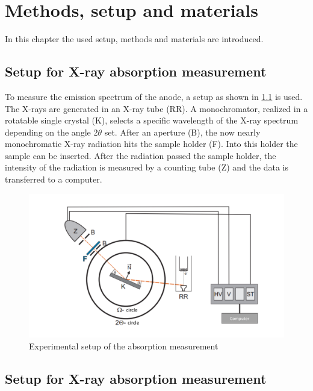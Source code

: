 

\chapter{Methods, setup and materials}
\label{chap:methods}

In this chapter the used setup, methods and materials are introduced.

\section[Absorption measurement]{Setup for X-ray absorption measurement}
\label{sec:SetupAbsorb}
To measure the emission spectrum of the anode, a setup as shown in \cref{fig:setupabs} is used. The X-rays are generated in an X-ray tube (RR). A monochromator, realized in a rotatable single crystal (K), 
selects a specific wavelength of the X-ray spectrum depending on the angle 2$\theta$ set. After an aperture (B), the now nearly monochromatic X-ray radiation hits the sample holder (F). Into this holder the sample
can be inserted. After the radiation passed the sample holder, the intensity of the radiation is measured by a counting tube (Z) and the data is transferred to a computer.

\begin{figure}[h]
    \centering
    \includegraphics[width =\textwidth]{Bilder/Setup/SetupAbsorb.pdf}
    \caption{Experimental setup of the absorption measurement}
    \label{fig:setupabs}
\end{figure}


\section[Diffraction measurement]{Setup for X-ray absorption measurement}

